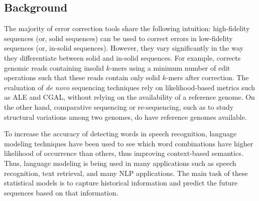 \vspace{-5pt}
\subsection{Background}


The majority of error correction tools share the following intuition: high-fidelity sequences (or, solid sequences) can be used to correct errors in low-fidelity sequences (or, in-solid sequences). However, they vary significantly in the way they differentiate between solid and in-solid sequences. For example, \citep{yang2010reptile} corrects genomic reads containing insolid $k$-mers using a minimum number of edit operations such that these reads contain only solid $k$-mers after correction.
The evaluation of \textit{de novo} sequencing techniques rely on likelihood-based metrics such as ALE and CGAL, without relying on the availability of a reference genome. On the other hand, comparative sequencing or re-sequencing, such as to study structural variations among two genomes, do have reference genomes available. 


To increase the accuracy of detecting words in speech recognition, language modeling techniques have been used to see which word combinations have higher likelihood of occurrence than others, thus improving context-based semantics. Thus, language modeling is being used in many applications such as speech recognition, text retrieval, and many NLP applications. The main task of these statistical models is to capture historical information and predict the future sequences based on that information.

